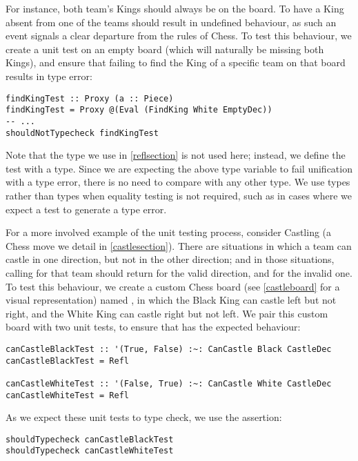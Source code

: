 For instance, both team's Kings should always be on the board. To have a King absent from one of the teams should result in undefined behaviour, as such an event signals a clear departure from the rules of Chess. To test this behaviour, we create a unit test on an empty board (which will naturally be missing both Kings), and ensure that failing to find the King of a specific team on that board results in type error:

\begin{lstlisting}
findKingTest :: Proxy (a :: Piece)
findKingTest = Proxy @(Eval (FindKing White EmptyDec))
-- ...
shouldNotTypecheck findKingTest
\end{lstlisting}

Note that the \inline{(:~:)} type we use in \cref{reflsection} is not used here; instead, we define the test with a  type. Since we are expecting the above type variable  to fail unification with a type error, there is no need to compare  with any other type. We use  types rather than \inline{(:~:)} types when equality testing is not required, such as in cases where we expect a test to generate a type error.

For a more involved example of the unit testing process, consider Castling (a Chess move we detail in \cref{castlesection}). There are situations in which a team can castle in one direction, but not in the other direction; and in those situations, calling  for that team should return  for the valid direction, and  for the invalid one. To test this behaviour, we create a custom Chess board (see \cref{castleboard} for a visual representation) named , in which the Black King can castle left but not right, and the White King can castle right but not left. We pair this custom board with two unit tests, to ensure that  has the expected behaviour:

\begin{lstlisting}
canCastleBlackTest :: '(True, False) :~: CanCastle Black CastleDec
canCastleBlackTest = Refl

canCastleWhiteTest :: '(False, True) :~: CanCastle White CastleDec
canCastleWhiteTest = Refl
\end{lstlisting}

As we expect these unit tests to type check, we use the  assertion:

\begin{lstlisting}
shouldTypecheck canCastleBlackTest
shouldTypecheck canCastleWhiteTest
\end{lstlisting}

